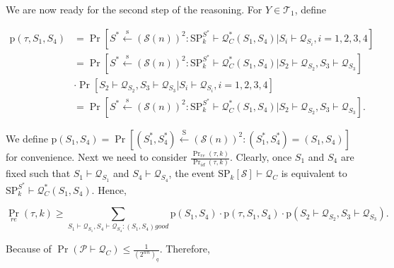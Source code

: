 We are now ready for the second step of the reasoning. For $Y \in \mathcal{T}_{1}$, define

\begin{equation}
\begin{aligned}
\mathrm{p}\left(\tau, S_{1}, S_{4}\right)&=\operatorname{Pr}\left[S^{*} \stackrel{\mathrm{s}}{\leftarrow}(\mathcal{S}(n))^{2}:
\mathrm{SP}_{k}^{S^{*}} \vdash \mathcal{Q}_{C}^{*}\left(S_{1}, S_{4}\right) | S_{i} \vdash \mathcal{Q}_{S_{i}}, i=1,2,3,4\right] \\
&=\operatorname{Pr}\left[S^{*} \stackrel{\mathrm{s}}{\leftarrow}(\mathcal{S}(n))^{2}: \mathrm{SP}_{k}^{S^{*}} \vdash \mathcal{Q}_{C}^{*}\left(S_{1},
S_{4}\right) | S_{2} \vdash \mathcal{Q}_{S_{2}}, S_{3} \vdash \mathcal{Q}_{S_{3}}\right] \\
& \cdot \operatorname{Pr}\left[S_{2} \vdash \mathcal{Q}_{S_{2}}, S_{3} \vdash \mathcal{Q}_{S_{3}}| S_{i} \vdash \mathcal{Q}_{S_{i}}, i=1,2,3,4\right]\\
&=\operatorname{Pr}\left[S^{*} \stackrel{\mathrm{s}}{\leftarrow}(\mathcal{S}(n))^{2}: \mathrm{SP}_{k}^{S^{*}} \vdash \mathcal{Q}_{C}^{*}\left(S_{1},
S_{4}\right) | S_{2} \vdash \mathcal{Q}_{S_{2}}, S_{3} \vdash \mathcal{Q}_{S_{3}}\right].
\end{aligned}
\end{equation}

We define $\mathrm{p}\left(S_{1}, S_{4}\right) = \operatorname{Pr}\left[\left(S_{1}^{*}, S_{4}^{*}\right)
\stackrel{\mathrm{S}}{\leftarrow}(\mathcal{S}(n))^{2}: \left(S_{1}^{*}, S_{4}^{*}\right)=\left(S_{1}, S_{4}\right)\right]$ for convenience. Next we need to consider  $\frac{\operatorname{Pr}_{r e}(\tau, k)}{\operatorname{Pr}_{i d}(\tau, k)}$. Clearly, once $S_{1}$ and $S_{4}$ are fixed such that $S_{1} \vdash \mathcal{Q}_{S_{1}}$ and $S_{4} \vdash \mathcal{Q}_{S_{4}}$, the event
$\mathrm{SP}_{k}[\mathcal{S}] \vdash \mathcal{Q}_{C}$ is equivalent to $\mathrm{SP}_{k}^{S^{*}} \vdash \mathcal{Q}_{C}^{*}\left(S_{1}, S_{4}\right)$. Hence,

$$
\operatorname{Pr}_{r e}(\tau, k) \geq \sum_{S_{1} \vdash \mathcal{Q}_{S_{1}}, S_{4} \vdash \mathcal{Q}_{S_{4}}:\left(S_{1}, S_{4}\right) good }
\mathrm{p}\left(S_{1}, S_{4}\right) \cdot \mathrm{p}\left(\tau, S_{1}, S_{4}\right) \cdot \mathrm{p}\left(S_{2} \vdash \mathcal{Q}_{S_{2}},S_{3} \vdash \mathcal{Q}_{S_{3}}\right).
$$

\noindent Because of $\operatorname{Pr} (\mathcal{P}  \vdash \mathcal{Q}_{C}) \le \frac{1}{\left(2^{w n}\right)_{q}}$. Therefore,\\

